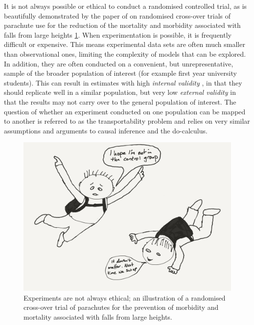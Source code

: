 \documentclass[11pt,a4paper,twoside]{report}
\theoremstyle{plain}
\theoremstyle{definition}
\begin{document}
It is not always possible or ethical to conduct a randomised controlled trial, as is beautifully demonstrated by the paper of \citet{smith2003parachute} on randomised cross-over trials of parachute use for the reduction of the mortality and morbidity associated with falls from large heights \ref{fig:parashute}. When experimentation is possible, it is frequently difficult or expensive. This means experimental data sets are often much smaller than observational ones, limiting the complexity of models that can be explored. In addition, they are often conducted on a convenient, but unrepresentative, sample of the broader population of interest (for example first year university students). This can result in estimates with high \emph{internal validity} \citep{Campbell1963}, in that they should replicate well in a similar population, but very low \emph{external validity} in that the results may not carry over to the general population of interest. The question of whether an experiment conducted on one population can be mapped to another is referred to as the transportability problem \citep{Bareinboim2013} and relies on very similar assumptions and arguments to causal inference and the do-calculus. 

\begin{figure}
\begin{center}
\includegraphics[scale=.4]{double_blind_parashute_trial_cartoon.png}
\end{center}
\caption{Experiments are not always ethical; an illustration of a randomised cross-over trial of parachutes for the prevention of morbidity and mortality associated with falls from large heights.}
\label{fig:parashute}
\end{figure}
\end{document}
